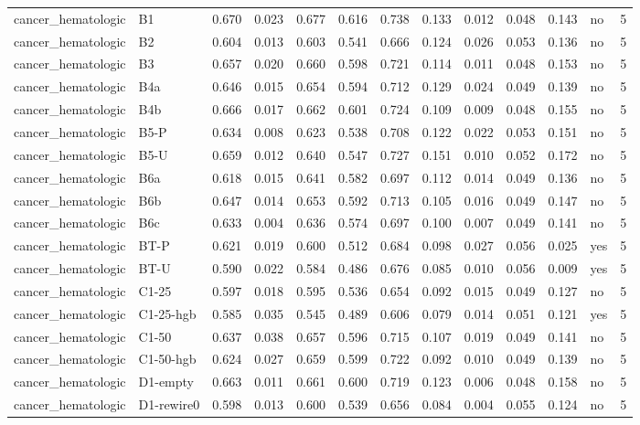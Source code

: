 \begin{table}[t]
\begin{tabular}{lllllllllllll}
cancer\_hematologic & B1 & 0.670 & 0.023 & 0.677 & 0.616 & 0.738 & 0.133 & 0.012 & 0.048 & 0.143 & no & 5 \\
cancer\_hematologic & B2 & 0.604 & 0.013 & 0.603 & 0.541 & 0.666 & 0.124 & 0.026 & 0.053 & 0.136 & no & 5 \\
cancer\_hematologic & B3 & 0.657 & 0.020 & 0.660 & 0.598 & 0.721 & 0.114 & 0.011 & 0.048 & 0.153 & no & 5 \\
cancer\_hematologic & B4a & 0.646 & 0.015 & 0.654 & 0.594 & 0.712 & 0.129 & 0.024 & 0.049 & 0.139 & no & 5 \\
cancer\_hematologic & B4b & 0.666 & 0.017 & 0.662 & 0.601 & 0.724 & 0.109 & 0.009 & 0.048 & 0.155 & no & 5 \\
cancer\_hematologic & B5-P & 0.634 & 0.008 & 0.623 & 0.538 & 0.708 & 0.122 & 0.022 & 0.053 & 0.151 & no & 5 \\
cancer\_hematologic & B5-U & 0.659 & 0.012 & 0.640 & 0.547 & 0.727 & 0.151 & 0.010 & 0.052 & 0.172 & no & 5 \\
cancer\_hematologic & B6a & 0.618 & 0.015 & 0.641 & 0.582 & 0.697 & 0.112 & 0.014 & 0.049 & 0.136 & no & 5 \\
cancer\_hematologic & B6b & 0.647 & 0.014 & 0.653 & 0.592 & 0.713 & 0.105 & 0.016 & 0.049 & 0.147 & no & 5 \\
cancer\_hematologic & B6c & 0.633 & 0.004 & 0.636 & 0.574 & 0.697 & 0.100 & 0.007 & 0.049 & 0.141 & no & 5 \\
cancer\_hematologic & BT-P & 0.621 & 0.019 & 0.600 & 0.512 & 0.684 & 0.098 & 0.027 & 0.056 & 0.025 & yes & 5 \\
cancer\_hematologic & BT-U & 0.590 & 0.022 & 0.584 & 0.486 & 0.676 & 0.085 & 0.010 & 0.056 & 0.009 & yes & 5 \\
cancer\_hematologic & C1-25 & 0.597 & 0.018 & 0.595 & 0.536 & 0.654 & 0.092 & 0.015 & 0.049 & 0.127 & no & 5 \\
cancer\_hematologic & C1-25-hgb & 0.585 & 0.035 & 0.545 & 0.489 & 0.606 & 0.079 & 0.014 & 0.051 & 0.121 & yes & 5 \\
cancer\_hematologic & C1-50 & 0.637 & 0.038 & 0.657 & 0.596 & 0.715 & 0.107 & 0.019 & 0.049 & 0.141 & no & 5 \\
cancer\_hematologic & C1-50-hgb & 0.624 & 0.027 & 0.659 & 0.599 & 0.722 & 0.092 & 0.010 & 0.049 & 0.139 & no & 5 \\
cancer\_hematologic & D1-empty & 0.663 & 0.011 & 0.661 & 0.600 & 0.719 & 0.123 & 0.006 & 0.048 & 0.158 & no & 5 \\
cancer\_hematologic & D1-rewire0 & 0.598 & 0.013 & 0.600 & 0.539 & 0.656 & 0.084 & 0.004 & 0.055 & 0.124 & no & 5 \\

\end{tabular}
\end{table}
